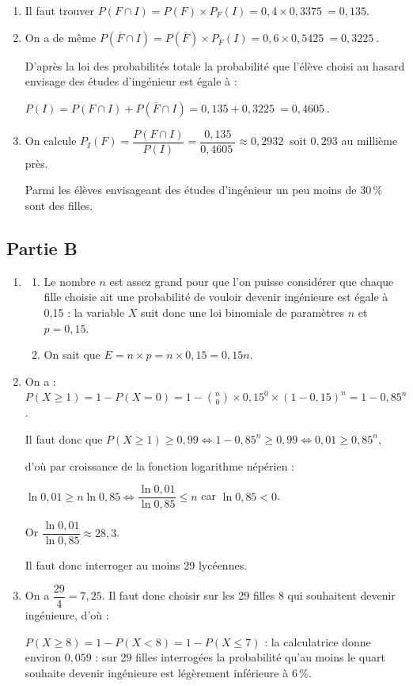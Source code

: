 \documentclass[10pt]{article}
\providecommand{\np}[2][]{{#2~#1}}
\providecommand{\ds}{\displaystyle}
\begin{document}
\begin{enumerate}
\begin{center}
	\end{center}

	\item Il faut trouver $P(F \cap I)=  P(F) \times P_F(I) = 0,4 \times \np{0,3375} = 0,135$.

	\item On a de même $P\left(\overline{F} \cap I\right)=  P\left(\overline{F}\right) \times P_{\overline{F}}(I) = 0,6 \times \np{0,5425} = \np{0,3225}$.

	D'après la loi des probabilités totale la probabilité que l'élève choisi au hasard envisage des études d'ingénieur est égale à :

	$P(I) = P(F \cap I) + P\left(\overline{F} \cap I\right) = 0,135 + \np{0,3225} = \np{0,4605}$.

	\item On calcule $P_I(F) = \dfrac{P(F \cap I)}{P(I)} = \dfrac{0,135}{\np{0,4605}} \approx \np{0,2932}$ soit $0,293$ au millième près.

	Parmi les élèves envisageant des études d'ingénieur un peu moins de 30\,\% sont des filles.
\end{enumerate}

\subsection*{Partie B}
\begin{enumerate} \item
	\begin{enumerate}
		\item Le nombre $n$ est assez grand pour que l'on puisse considérer que chaque fille choisie ait une probabilité de vouloir devenir ingénieure est égale à 0,15 : la variable $X$ suit donc une loi binomiale de paramètres $n$ et $p = 0,15$.

		\item On sait que $E  = n \times p = n \times 0,15 = 0,15n$.
	\end{enumerate}
	\item On a : $P(X \geqslant 1) = 1 - P(X = 0) =\ds 1 - \binom{n}{0} \times 0,15^0 \times (1 - 0,15)^n = 1 - 0,85^n$.

	Il faut donc que $P(X \geqslant 1) \geqslant 0,99 \iff 1 - 0,85^n \geqslant 0,99 \iff 0,01 \geqslant 0,85^n$,

	d'où par croissance de la fonction logarithme népérien :

	$\ln 0,01 \geqslant n\ln 0,85 \iff \dfrac{\ln 0,01}{\ln 0,85} \leqslant n$ car $\ln 0,85 < 0$.

	Or $\dfrac{\ln 0,01}{\ln 0,85} \approx 28,3$.

	Il faut donc interroger au moins 29 lycéennes.

	\item On a $\dfrac{29}{4} = 7,25$. Il faut donc choisir sur les 29 filles 8 qui souhaitent devenir ingénieure, d'où :

	$P(X\geqslant 8) = 1 - P(X < 8) = 1 - P(X \leqslant 7)
	$ : la calculatrice donne environ $0,059$ : sur 29 filles interrogées la probabilité qu'au moins le quart souhaite devenir ingénieure est légèrement inférieure à 6\,\%.
\end{enumerate}
\end{document}
